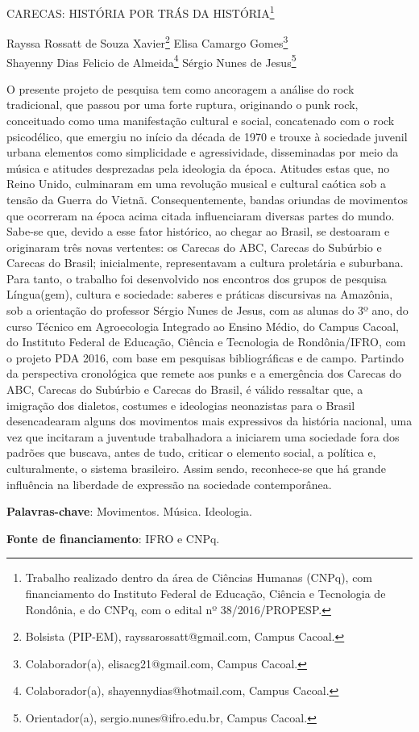 \documentclass[article,12pt,onesidea,4paper,english,brazil]{abntex2}
\begin{document}
	
	
	\frenchspacing 
	
	\begin{center}
		\LARGE CARECAS: HISTÓRIA POR TRÁS DA HISTÓRIA\footnote{Trabalho realizado dentro da área de Ciências Humanas (CNPq), com financiamento do Instituto Federal de Educação, Ciência e Tecnologia de Rondônia, e do CNPq, com o edital nº 38/2016/PROPESP.}
		
		\normalsize
	Rayssa Rossatt de Souza Xavier\footnote{Bolsista (PIP-EM), rayssarossatt@gmail.com, Campus Cacoal.} 
	Elisa Camargo Gomes\footnote{Colaborador(a), elisacg21@gmail.com, Campus Cacoal.} \\
		Shayenny Dias Felicio de Almeida\footnote{Colaborador(a), shayennydias@hotmail.com, Campus Cacoal.} 
		Sérgio Nunes de Jesus\footnote{Orientador(a), sergio.nunes@ifro.edu.br, Campus Cacoal.} 
	\end{center}
	
	\noindent O presente projeto de pesquisa tem como ancoragem a análise do rock tradicional, que passou por uma forte ruptura, originando o punk rock, conceituado como uma manifestação cultural e social, concatenado com o rock psicodélico, que emergiu no início da década de 1970 e trouxe à sociedade juvenil urbana elementos como simplicidade e agressividade, disseminadas por meio da música e atitudes desprezadas pela ideologia da época. Atitudes estas que, no Reino Unido, culminaram em uma revolução musical e cultural caótica sob a tensão da Guerra do Vietnã. Consequentemente, bandas oriundas de movimentos que ocorreram na época acima citada influenciaram diversas partes do mundo. Sabe-se que, devido a esse fator histórico, ao chegar ao Brasil, se destoaram e originaram três novas vertentes: os Carecas do ABC, Carecas do Subúrbio e Carecas do Brasil; inicialmente, representavam a cultura proletária e suburbana. Para tanto, o trabalho foi desenvolvido nos encontros dos grupos de pesquisa Língua(gem), cultura e sociedade: saberes e práticas discursivas na Amazônia, sob a orientação do professor Sérgio Nunes de Jesus, com as alunas do 3º ano, do curso Técnico em Agroecologia Integrado ao Ensino Médio, do Campus Cacoal, do Instituto Federal de Educação, Ciência e Tecnologia de Rondônia/IFRO, com o projeto PDA 2016, com base em pesquisas bibliográficas e de campo. Partindo da perspectiva cronológica que remete aos punks e a emergência dos Carecas do ABC, Carecas do Subúrbio e Carecas do Brasil, é válido ressaltar que, a imigração dos dialetos, costumes e ideologias neonazistas para o Brasil desencadearam alguns dos movimentos mais expressivos da história nacional, uma vez que incitaram a juventude trabalhadora a iniciarem uma sociedade fora dos padrões que buscava, antes de tudo, criticar o elemento social, a política e, culturalmente, o sistema brasileiro. Assim sendo, reconhece-se que há grande influência na liberdade de expressão na sociedade contemporânea.
	
	\vspace{\onelineskip}
	
	\noindent
	\textbf{Palavras-chave}: Movimentos. Música. Ideologia. 
	
	\noindent
	\textbf{Fonte de financiamento}: IFRO e CNPq.
	
\end{document}
